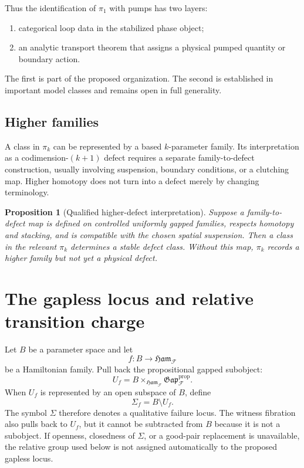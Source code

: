 \documentclass[12pt]{article}
\newtheorem{proposition}[theorem]{Proposition}
\theoremstyle{definition}
\theoremstyle{remark}
\newcommand{\F}{\mathcal F}
\newcommand{\Ham}{\mathfrak{Ham}}
\newcommand{\Gap}{\mathfrak{Gap}}
\begin{document}
Thus the identification of $\pi_1$ with pumps has two layers:
\begin{enumerate}[leftmargin=2.2em]
  \item categorical loop data in the stabilized phase object;
  \item an analytic transport theorem that assigns a physical pumped
  quantity or boundary action.
\end{enumerate}
The first is part of the proposed organization.  The second is established
in important model classes and remains open in full generality.

\subsection{Higher families}

A class in $\pi_k$ can be represented by a based $k$-parameter family.  Its
interpretation as a codimension-$(k+1)$ defect requires a separate
family-to-defect construction, usually involving suspension, boundary
conditions, or a clutching map.  Higher homotopy does not turn into a defect
merely by changing terminology.

\begin{proposition}[Qualified higher-defect interpretation]
Suppose a family-to-defect map is defined on controlled uniformly gapped
families, respects homotopy and stacking, and is compatible with the chosen
spatial suspension.  Then a class in the relevant $\pi_k$ determines a
stable defect class.  Without this map, $\pi_k$ records a higher family but
not yet a physical defect.
\end{proposition}

\section{The gapless locus and relative transition charge}

Let $B$ be a parameter space and let
\begin{equation}
f:B\longrightarrow\Ham_{\F}
\label{eq:parameter-map}
\end{equation}
be a Hamiltonian family.  Pull back the propositional gapped subobject:
\begin{equation}
U_f
=
B\times_{\Ham_{\F}}\Gap^{\mathrm{prop}}_{\F}.
\label{eq:gapped-pullback}
\end{equation}
When $U_f$ is represented by an open subspace of $B$, define
\begin{equation}
\Sigma_f=B\setminus U_f.
\label{eq:gapless-locus}
\end{equation}
The symbol $\Sigma$ therefore denotes a qualitative failure locus.  The
witness fibration also pulls back to $U_f$, but it cannot be subtracted from
$B$ because it is not a subobject.  If openness, closedness of $\Sigma$, or a
good-pair replacement is unavailable, the relative group used below is not
assigned automatically to the proposed gapless locus.
\end{document}
